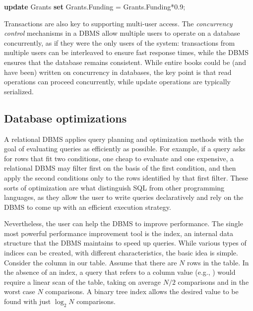 \documentclass[]{krantz}
\newenvironment{Shaded}{\begin{snugshade}}{\end{snugshade}}
\newcommand{\KeywordTok}[1]{\textcolor[rgb]{0.13,0.29,0.53}{\textbf{#1}}}
\newcommand{\FloatTok}[1]{\textcolor[rgb]{0.00,0.00,0.81}{#1}}
\newcommand{\NormalTok}[1]{#1}
\begin{document}
\begin{Shaded}
\begin{Highlighting}[]
\KeywordTok{update}\NormalTok{ Grants }\KeywordTok{set}\NormalTok{ Grants.Funding = Grants.Funding*}\FloatTok{0.9}\NormalTok{;}
\end{Highlighting}
\end{Shaded}

Transactions are also key to supporting multi-user access. The
\emph{concurrency control} mechanisms in a DBMS allow multiple users to
operate on a database concurrently, as if they were the only users of
the system: transactions from multiple users can be interleaved to
ensure fast response times, while the DBMS ensures that the database
remains consistent. While entire books could be (and have been) written
on concurrency in databases, the key point is that read operations can
proceed concurrently, while update operations are typically serialized.

\hypertarget{sec:db:index}{\subsection{Database
optimizations}\label{sec:db:index}}

A relational DBMS applies query planning and optimization methods with
the goal of evaluating queries as efficiently as possible. For example,
if a query asks for rows that fit two conditions, one cheap to evaluate
and one expensive, a relational DBMS may filter first on the basis of
the first condition, and then apply the second conditions only to the
rows identified by that first filter. These sorts of optimization are
what distinguish SQL from other programming languages, as they allow the
user to write queries declaratively and rely on the DBMS to come up with
an efficient execution strategy.

Nevertheless, the user can help the DBMS to improve performance. The
single most powerful performance improvement tool is the index, an
internal data structure that the DBMS maintains to speed up queries.
While various types of indices can be created, with different
characteristics, the basic idea is simple. Consider the column in our
table. Assume that there are \(N\) rows in the table. In the absence of
an index, a query that refers to a column value (e.g., ) would require a
linear scan of the table, taking on average \(N/2\) comparisons and in
the worst case \(N\) comparisons. A binary tree index allows the desired
value to be found with just \(\log_2 N\) comparisons.
\end{document}

